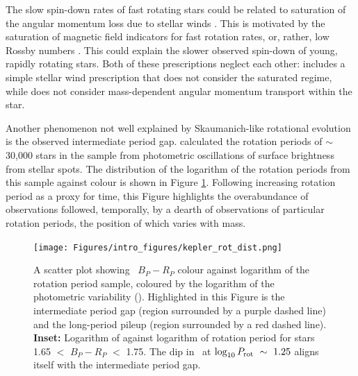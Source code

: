 The slow spin-down rates of fast rotating stars could  be related to saturation of the angular momentum loss due to stellar winds \citep{johnstone_stellar_2015, johnstone_stellar_2015-1,gallet_improved_2013}.
This is motivated by the saturation of magnetic field indicators for fast rotation rates, or, rather, low Rossby numbers \citep{wright_stellar-activity-rotation_2011}.
This could explain the slower observed spin-down of young, rapidly rotating stars.
Both of these prescriptions neglect each other: \citet{spada_competing_2020} includes a simple stellar wind prescription that does not consider the saturated regime, while \citet{gallet_improved_2013} does not consider mass-dependent angular momentum transport within the star.

Another phenomenon not well explained by Skaumanich-like rotational evolution is the observed intermediate period gap.
\citet{mcquillan_rotation_2014} calculated the rotation periods of $\sim$30,000 stars in the \kepler{} sample from photometric oscillations of surface brightness from stellar spots.
The distribution of the logarithm of the rotation periods from this sample against colour is shown in Figure \ref{fig:kepler_rot_period}. 
Following increasing rotation period as a proxy for time, this Figure highlights the overabundance of observations followed, temporally, by a dearth of observations of particular rotation periods, the position of which varies with mass.

\begin{figure}[h]
    \texttt{[image: Figures/intro\_figures/kepler\_rot\_dist.png]}
    \caption[The rotation period distribution of the \citet{mcquillan_rotation_2014} sample highlighting the intermediate period gap and long-period pileup.]{A scatter plot showing \GDRT \ $B_P-R_P$ colour against logarithm of the \kepler{} \citet{mcquillan_rotation_2014} rotation period sample, coloured by the logarithm of the photometric variability (\rper). Highlighted in this Figure is the intermediate period gap (region surrounded by a purple dashed line) and the long-period pileup (region surrounded by a red dashed line). \textbf{Inset:} Logarithm of \rper{} against logarithm of rotation period for stars 1.65 $<$ $B_P - R_P$ $<$ 1.75.  The dip in \rper\ at $\log_{10} P_{\rm{rot}} \ \sim\ 1.25$ aligns itself with the intermediate period gap.
    }
    \label{fig:kepler_rot_period}
\end{figure}

